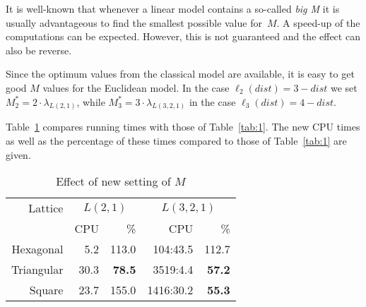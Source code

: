 \documentclass[smallextended]{svjour3}
\begin{document}
It is well-known that whenever a linear model contains a so-called \emph{big M} 
it is usually advantageous to find the smallest possible value for~$M$. 
A speed-up of the computations can be expected. However, this is not 
guaranteed and the effect can also be reverse. 

\begin{comment} 
A good value for $M$ is clearly not smaller than the value that CPLEX 
would find for $\lambda+j_1$. But with this property it should 
be as small as possible since the bigger the value of $M$ is, the 
larger the size of the search space. The fact is that we have more 
inequalities, in this point the problem should be more complex. But 
the other side, these inequalities can help in the process of Branch-and-Bound, 
that can make the calculations faster. So, it should be tried to see 
whether the modification is effective in some cases. For this purpose, 
we must be able to estimate the results. A correct estimation of the 
value multiplied by a constant is already useful (if it is smaller 
than the original $M$-value). 
\end{comment} 

Since the optimum values from the classical 
model are available, it is easy to get good $M$ values for the Euclidean 
model. In the case $\ell_{2}(dist)=3-dist$ we set $M_{2}^{*}=2\cdot\lambda_{L(2,1)}$, 
while $M_{3}^{*}=3\cdot\lambda_{L(3,2,1)}$ in the case $\ell_{3}(dist)=4-dist$. 

Table~\ref{tab:4} compares  running times with those of Table~\ref{tab:1}. 
The new CPU times as well as the percentage of these times compared to 
those of Table~\ref{tab:1} are given. 

\begin{table}[h] 
\begin{center} 
\renewcommand{\arraystretch}{1.3} 
\renewcommand{\tabcolsep}{10pt} 
\begin{tabular}{|r||r|r||r|r|} 
\hline 
Lattice  & \multicolumn{2}{c||}{$L(2,1)$} & \multicolumn{2}{c|}{$L(3,2,1)$} \\ 
  & CPU & \% & CPU & \%\\ 
\hline 
Hexagonal & 5.2 & 113.0 & 104:43.5 & 112.7 \\ 
\hline 
Triangular  & 30.3 & \textbf{78.5} & 3519:4.4 & \textbf{57.2} \\ 
\hline 
Square      & 23.7 & 155.0 & 1416:30.2 & \textbf{55.3} \\ 
\hline 
\end{tabular} 
\end{center} 
\caption{Effect of new setting of $M$}\label{tab:4} 
\end{table} 
\end{document}
